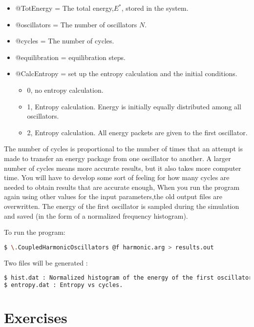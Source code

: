 \documentclass[10pt]{article}
\begin{document}
\begin{itemize}

\item @TotEnergy   = The total energy,$E^*$, stored in the system.
\item @oscillators = The number of oscillators $N$.
\item @cycles = The number of cycles.
\item @equilibration = equilibration steps.
\item @CalcEntropy = set up the entropy calculation and the initial conditions.
\begin{itemize}
\item 0, no entropy calculation.
\item 1, Entropy calculation. Energy is initially equally distributed among all oscillators.
\item 2, Entropy calculation. All energy packets are given to the first oscillator. 
\end{itemize}
\end{itemize}

The number of cycles is proportional to the number of times that an attempt is made to transfer an energy package from one oscillator to another. A larger number of cycles means more accurate results, but it also takes more computer time. You will have to develop some sort of feeling for how many cycles are needed to obtain results that are accurate enough, When you run the program again using other values for the input parameters,the old output files are overwritten. The energy of the first oscillator is sampled during the simulation and saved (in the form of a normalized frequency histogram).

To run the program:

\begin{lstlisting}[language=bash]
$ \.CoupledHarmonicOscillators @f harmonic.arg > results.out
\end{lstlisting} 

Two files will be generated :

\begin{lstlisting}[language=bash]
$ hist.dat : Normalized histogram of the energy of the first oscillator.
$ entropy.dat : Entropy vs cycles.
\end{lstlisting}


\section{Exercises}
\end{document}
